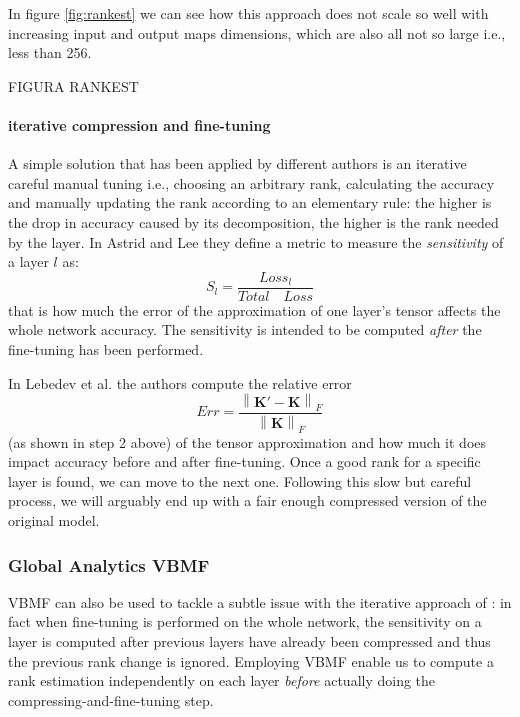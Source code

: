 In figure \ref{fig:rankest} we can see how this approach does not scale so well with increasing input and output maps dimensions, which are also all not so large i.e., less than 256.

FIGURA RANKEST 


\newline 
\paragraph{iterative compression and fine-tuning}
A simple solution that has been applied by different authors is an iterative careful manual tuning \parencite{astrid2017} \parencite{lebedev2014} i.e., choosing an arbitrary rank, calculating the accuracy and manually updating the rank according to an elementary rule: the higher is the drop in accuracy caused by its decomposition, the higher is the rank needed by the layer.
\newline 
In Astrid and Lee \parencite{astrid2017} they define a metric to measure the \emph{sensitivity} of a layer $l$ as:
\begin{equation}
	S_{l} = \frac{Loss_l}{Total \quad Loss}
\end{equation}
that is how much the error of the approximation of one layer's tensor affects the whole network accuracy. The sensitivity is intended to be computed \emph{after} the fine-tuning has been performed. 
\newline 

In Lebedev et al. \parencite{lebedev2014} the authors compute the relative error $$ Err = \frac{\left \| \mathbf{K'} - \mathbf{K}  \right \|_{F}}{\left \| \mathbf{K} \right \|_{F}}$$ (as shown in step 2 above) of the tensor approximation and how much it does impact accuracy before and after fine-tuning.  
Once a good rank for a specific layer is found, we can move to the next one. Following this slow but careful process, we will arguably end up with a fair enough compressed version of the original model. 

\subsubsection{Global Analytics VBMF}

VBMF can also be used to tackle a subtle issue with the iterative approach of \parencite{astrid2017}: in fact when fine-tuning is performed on the whole network, the sensitivity on a layer is computed after previous layers have already been compressed and thus the previous rank change is ignored. Employing VBMF enable us to compute a rank estimation independently on each layer \emph{before} actually doing the compressing-and-fine-tuning step. 


